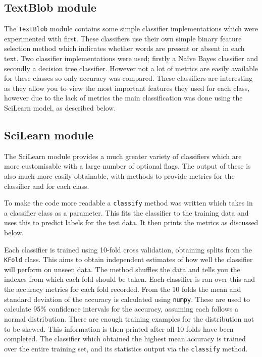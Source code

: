 \documentclass{article}
\begin{document}
\subsection{TextBlob module}
The \verb|TextBlob| module contains some simple classifier implementations which were experimented with first. These classifiers use their own simple binary feature selection method which indicates whether words are present or absent in each text. Two classifier implementations were used; firstly a Na{\"i}ve Bayes classifier and secondly a decision tree classifier. However not a lot of metrics are easily available for these classes so only accuracy was compared. These classifiers are interesting as they allow you to view the most important features they used for each class, however due to the lack of metrics the main classification was done using the SciLearn model, as described below.

\subsection{SciLearn module}
The SciLearn module provides a much greater variety of classifiers which are more customisable with a large number of optional flags. The output of these is also much more easily obtainable, with methods to provide metrics for the classifier and for each class.

To make the code more readable a \verb|classify| method was written which takes in a classifier class as a parameter. This fits the classifier to the training data and uses this to predict labels for the test data. It then prints the metrics as discussed below.

Each classifier is trained using 10-fold cross validation, obtaining splits from the \verb|KFold| class. This aims to obtain independent estimates of how well the classifier will perform on unseen data. The method shuffles the data and tells you the indexes from which each fold should be taken. Each classifier is ran over this and the accuracy metrics for each fold recorded. From the 10 folds the mean and standard deviation of the accuracy is calculated using \verb|numpy|. These are used to calculate 95\% confidence intervals for the accuracy, assuming each follows a normal distribution. There are enough training examples for the distribution not to be skewed. This information is then printed after all 10 folds have been completed. The classifier which obtained the highest mean accuracy is trained over the entire training set, and its statistics output via the \verb|classify| method.
\end{document}
